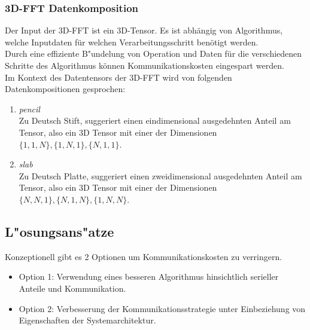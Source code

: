 \subsubsection{3D-FFT Datenkomposition}
Der Input der 3D-FFT ist ein 3D-Tensor. Es ist abhängig von Algorithmus, welche Inputdaten für welchen Verarbeitungsschritt benötigt werden.\\
Durch eine effiziente B"undelung von Operation und Daten für die verschiedenen Schritte des Algorithmus können Kommunikationskosten eingespart werden.\\
Im Kontext des Datentensors der 3D-FFT wird von folgenden Datenkompositionen gesprochen:
\begin{enumerate}
	\item \textit{pencil}\\
		Zu Deutsch Stift, suggeriert einen eindimensional ausgedehnten Anteil am Tensor, also ein 3D Tensor mit einer der Dimensionen $\{1,1,N\},\{1,N,1\},\{N,1,1\}$.
	\item \textit{slab}\\
		Zu Deutsch Platte, suggeriert einen zweidimensional ausgedehnten Anteil am Tensor, also ein 3D Tensor mit einer der Dimensionen $\{N,N,1\},\{N,1,N\},\{1,N,N\}$.
\end{enumerate}

\subsection{L"osungsans"atze}
Konzeptionell gibt es 2 Optionen um Kommunikationskosten zu verringern.
\begin{itemize}
	\item Option 1: Verwendung eines besseren Algorithmus hinsichtlich serieller Anteile und Kommunikation.
	\item Option 2: Verbesserung der Kommunikationsstrategie unter Einbeziehung von Eigenschaften der Systemarchitektur.
\end{itemize}

